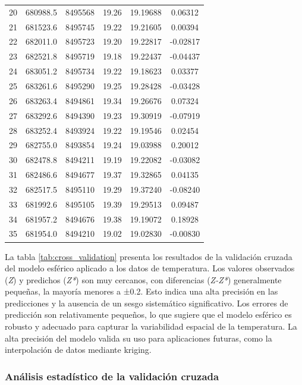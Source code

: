 \begin{longtable}{cccccc}
20 & 680988.5 & 8495568 & 19.26 & 19.19688 & 0.06312 \\
21 & 681523.6 & 8495745 & 19.22 & 19.21605 & 0.00394 \\
22 & 682011.0 & 8495723 & 19.20 & 19.22817 & -0.02817 \\
23 & 682521.8 & 8495719 & 19.18 & 19.22437 & -0.04437 \\
24 & 683051.2 & 8495734 & 19.22 & 19.18623 & 0.03377 \\
25 & 683261.6 & 8495290 & 19.25 & 19.28428 & -0.03428 \\
26 & 683263.4 & 8494861 & 19.34 & 19.26676 & 0.07324 \\
27 & 683292.6 & 8494390 & 19.23 & 19.30919 & -0.07919 \\
28 & 683252.4 & 8493924 & 19.22 & 19.19546 & 0.02454 \\
29 & 682755.0 & 8493854 & 19.24 & 19.03988 & 0.20012 \\
30 & 682478.8 & 8494211 & 19.19 & 19.22082 & -0.03082 \\
31 & 682486.6 & 8494677 & 19.37 & 19.32865 & 0.04135 \\
32 & 682517.5 & 8495110 & 19.29 & 19.37240 & -0.08240 \\
33 & 681992.6 & 8495105 & 19.39 & 19.29513 & 0.09487 \\
34 & 681957.2 & 8494676 & 19.38 & 19.19072 & 0.18928 \\
35 & 681954.0 & 8494210 & 19.02 & 19.02830 & -0.00830 \\
\end{longtable}

La tabla \ref{tab:cross_validation} presenta los resultados de la validación cruzada del modelo esférico aplicado a los datos de temperatura. Los valores observados (\textit{Z}) y predichos (\textit{Z*}) son muy cercanos, con diferencias (\textit{Z-Z*}) generalmente pequeñas, la mayoría menores a ±0.2. Esto indica una alta precisión en las predicciones y la ausencia de un sesgo sistemático significativo. Los errores de predicción son relativamente pequeños, lo que sugiere que el modelo esférico es robusto y adecuado para capturar la variabilidad espacial de la temperatura. La alta precisión del modelo valida su uso para aplicaciones futuras, como la interpolación de datos mediante kriging.


\subsubsection{Análisis estadístico de la validación cruzada }


